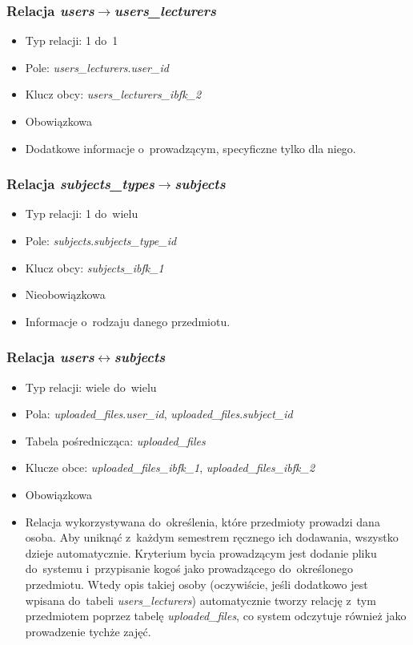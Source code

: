 \documentclass[a4paper,12pt,oneside]{report}
\begin{document}
\subsubsection{Relacja \emph{users}$\to$\emph{users\_lecturers}}
\label{subsub:users-users_lecturers}
\begin{itemize}
  \item Typ relacji: 1 do~1
  \item Pole: \emph{users\_lecturers}.\emph{user\_id}
  \item Klucz obcy: \emph{users\_lecturers\_ibfk\_2}
  \item Obowiązkowa
  \item Dodatkowe informacje o~prowadzącym, specyficzne tylko dla niego.
\end{itemize}

\subsubsection{Relacja \emph{subjects\_types}$\to$\emph{subjects}}
\label{subsub:subjects_types-subjects}
\begin{itemize}
  \item Typ relacji: 1 do~wielu
  \item Pole: \emph{subjects}.\emph{subjects\_type\_id}
  \item Klucz obcy: \emph{subjects\_ibfk\_1}
  \item Nieobowiązkowa
  \item Informacje o~rodzaju danego przedmiotu.
\end{itemize}

\subsubsection{Relacja \emph{users}$\leftrightarrow$\emph{subjects}}
\label{subsub:users-subjects}
\begin{itemize}
  \item Typ relacji: wiele do~wielu
  \item Pola: \emph{uploaded\_files}.\emph{user\_id}, \emph{uploaded\_files}.\emph{subject\_id}
  \item Tabela pośrednicząca: \emph{uploaded\_files}
  \item Klucze obce: \emph{uploaded\_files\_ibfk\_1}, \emph{uploaded\_files\_ibfk\_2}
  \item Obowiązkowa
  \item Relacja wykorzystywana do~określenia, które przedmioty prowadzi dana osoba. Aby uniknąć z~każdym semestrem ręcznego ich dodawania, wszystko dzieje automatycznie. Kryterium bycia prowadzącym jest dodanie pliku do~systemu i~przypisanie kogoś jako prowadzącego do~określonego przedmiotu. Wtedy opis takiej osoby (oczywiście, jeśli dodatkowo jest wpisana do~tabeli \emph{users\_lecturers}) automatycznie tworzy relację z~tym przedmiotem poprzez tabelę \emph{uploaded\_files}, co system odczytuje również jako prowadzenie tychże zajęć.
\end{itemize}
\end{document}
